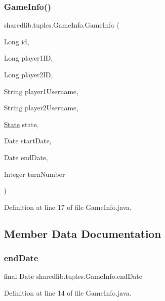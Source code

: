 \subsubsection{\texorpdfstring{Game\+Info()}{GameInfo()}}
{\footnotesize\ttfamily sharedlib.\+tuples.\+Game\+Info.\+Game\+Info (\begin{DoxyParamCaption}\item[{Long}]{id,  }\item[{Long}]{player1\+ID,  }\item[{Long}]{player2\+ID,  }\item[{String}]{player1\+Username,  }\item[{String}]{player2\+Username,  }\item[{\hyperlink{enumsharedlib_1_1tuples_1_1_game_info_1_1_state}{State}}]{state,  }\item[{Date}]{start\+Date,  }\item[{Date}]{end\+Date,  }\item[{Integer}]{turn\+Number }\end{DoxyParamCaption})}



Definition at line 17 of file Game\+Info.\+java.



\subsection{Member Data Documentation}
\hypertarget{classsharedlib_1_1tuples_1_1_game_info_a36b010041256c5e2e1d006ef2c6edf68}{}\label{classsharedlib_1_1tuples_1_1_game_info_a36b010041256c5e2e1d006ef2c6edf68} 
\subsubsection{\texorpdfstring{end\+Date}{endDate}}
{\footnotesize\ttfamily final Date sharedlib.\+tuples.\+Game\+Info.\+end\+Date}



Definition at line 14 of file Game\+Info.\+java.

\hypertarget{classsharedlib_1_1tuples_1_1_game_info_a26ad60530e62a05f87c0703818898ebe}{}\label{classsharedlib_1_1tuples_1_1_game_info_a26ad60530e62a05f87c0703818898ebe} 
